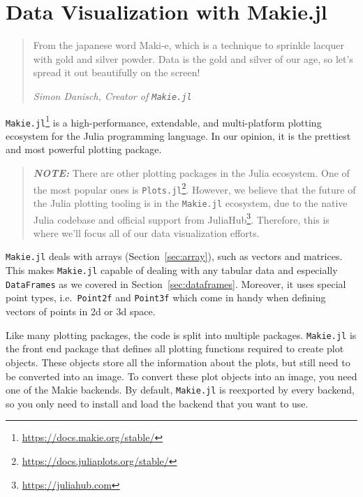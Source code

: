\documentclass[
  notoc %
]{tufte-book}
\DeclareRobustCommand{\href}[2]{#2\footnote{\url{#1}}}
\newcommand{\passthrough}[1]{#1}
\begin{document}
\hypertarget{sec:DataVisualizationMakie}{%
\chapter{Data Visualization with
Makie.jl}\label{sec:DataVisualizationMakie}}

\begin{quote}
From the japanese word Maki-e, which is a technique to sprinkle lacquer
with gold and silver powder. Data is the gold and silver of our age, so
let's spread it out beautifully on the screen!

\emph{Simon Danisch, Creator of \passthrough{\lstinline!Makie.jl!}}
\end{quote}

\href{https://docs.makie.org/stable/}{\passthrough{\lstinline!Makie.jl!}}
is a high-performance, extendable, and multi-platform plotting ecosystem
for the Julia programming language. In our opinion, it is the prettiest
and most powerful plotting package.

\begin{quote}
\textbf{\emph{NOTE:}} There are other plotting packages in the Julia
ecosystem. One of the most popular ones is
\href{https://docs.juliaplots.org/stable/}{\passthrough{\lstinline!Plots.jl!}}.
However, we believe that the future of the Julia plotting tooling is in
the \passthrough{\lstinline!Makie.jl!} ecosystem, due to the native
Julia codebase and official support from
\href{https://juliahub.com}{JuliaHub}. Therefore, this is where we'll
focus all of our data visualization efforts.
\end{quote}

\passthrough{\lstinline!Makie.jl!} deals with arrays
(Section~\ref{sec:array}), such as vectors and matrices. This makes
\passthrough{\lstinline!Makie.jl!} capable of dealing with any tabular
data and especially \passthrough{\lstinline!DataFrames!} as we covered
in Section~\ref{sec:dataframes}. Moreover, it uses special point types,
i.e.~\passthrough{\lstinline!Point2f!} and
\passthrough{\lstinline!Point3f!} which come in handy when defining
vectors of points in 2d or 3d space.

Like many plotting packages, the code is split into multiple packages.
\passthrough{\lstinline!Makie.jl!} is the front end package that defines
all plotting functions required to create plot objects. These objects
store all the information about the plots, but still need to be
converted into an image. To convert these plot objects into an image,
you need one of the Makie backends. By default,
\passthrough{\lstinline!Makie.jl!} is reexported by every backend, so
you only need to install and load the backend that you want to use.
\end{document}
